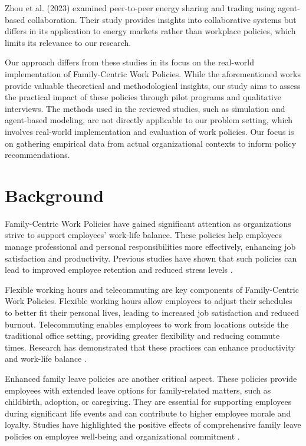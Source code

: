\documentclass{article} %
\begin{document}
Zhou et al. (2023) examined peer-to-peer energy sharing and trading using agent-based collaboration. Their study provides insights into collaborative systems but differs in its application to energy markets rather than workplace policies, which limits its relevance to our research.

Our approach differs from these studies in its focus on the real-world implementation of Family-Centric Work Policies. While the aforementioned works provide valuable theoretical and methodological insights, our study aims to assess the practical impact of these policies through pilot programs and qualitative interviews. The methods used in the reviewed studies, such as simulation and agent-based modeling, are not directly applicable to our problem setting, which involves real-world implementation and evaluation of work policies. Our focus is on gathering empirical data from actual organizational contexts to inform policy recommendations.

\section{Background}
\label{sec:background}

Family-Centric Work Policies have gained significant attention as organizations strive to support employees' work-life balance. These policies help employees manage professional and personal responsibilities more effectively, enhancing job satisfaction and productivity. Previous studies have shown that such policies can lead to improved employee retention and reduced stress levels \cite{park2023generative, shanahan2023role}.

Flexible working hours and telecommuting are key components of Family-Centric Work Policies. Flexible working hours allow employees to adjust their schedules to better fit their personal lives, leading to increased job satisfaction and reduced burnout. Telecommuting enables employees to work from locations outside the traditional office setting, providing greater flexibility and reducing commute times. Research has demonstrated that these practices can enhance productivity and work-life balance \cite{wang2023describe, liu2023agentbench}.

Enhanced family leave policies are another critical aspect. These policies provide employees with extended leave options for family-related matters, such as childbirth, adoption, or caregiving. They are essential for supporting employees during significant life events and can contribute to higher employee morale and loyalty. Studies have highlighted the positive effects of comprehensive family leave policies on employee well-being and organizational commitment \cite{poledna2023economic, west2023agent}.
\end{document}
